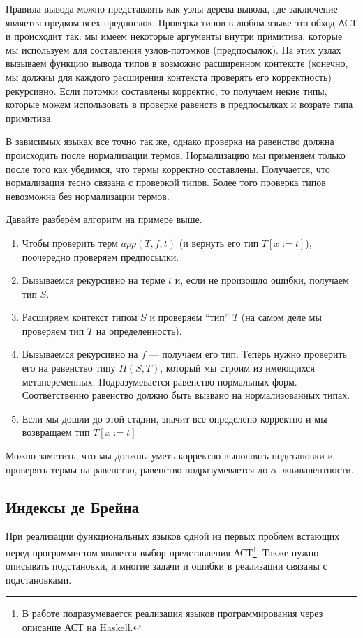 Правила вывода можно представлять как узлы дерева вывода, где заключение является предком всех предпослок. Проверка типов в любом языке это обход АСТ и происходит так: мы имеем некоторые аргументы внутри примитива, которые мы используем для составления узлов-потомков (предпосылок). На этих узлах вызываем функцию вывода типов в возможно расширенном контексте (конечно, мы должны для каждого расширения контекста проверять его корректность) рекурсивно. Если потомки составлены корректно, то получаем некие типы, которые можем использовать в проверке равенств в предпосылках и возрате типа примитива.

В зависимых языках все точно так же, однако проверка на равенство должна происходить после нормализации термов. Нормализацию мы применяем только после того как убедимся, что термы корректно составлены. Получается, что нормализация тесно связана с проверкой типов. Более того проверка типов невозможна без нормализации термов.

Давайте разберём алгоритм на примере выше.
\begin{enumerate}
\item Чтобы проверить терм $app(T, f, t)$ (и вернуть его тип $T[x:=t]$), поочередно проверяем предпосылки. \item Вызываемся рекурсивно на терме $t$ и, если не произошло ошибки, получаем тип $S$.
\item Расширяем контекст типом $S$ и проверяем ``тип'' $T$ (на самом деле мы проверяем тип $T$ на определенность).
\item Вызываемся рекурсивно на $f$ --- получаем его тип. Теперь нужно проверить его на равенство типу $\Pi(S, T)$, который мы строим из имеющихся метапеременных. Подразумевается равенство нормальных форм. Соответственно равенство должно быть вызвано на нормализованных типах.
\item Если мы дошли до этой стадии, значит все определено корректно и мы возвращаем тип $T[x:=t]$
\end{enumerate}

Можно заметить, что мы должны уметь корректно выполнять подстановки и проверять термы на равенство, равенство подразумевается до $\alpha$-эквивалентности.

\subsection{Индексы де Брейна}\label{de_brujin}
При реализации функциональных языков одной из первых проблем встающих перед программистом является выбор представления АСТ\footnote{В работе подразумевается реализация языков программирования через описание АСТ на Haskell.}. Также нужно описывать подстановки, и многие задачи и ошибки в реализации связаны с подстановками.

